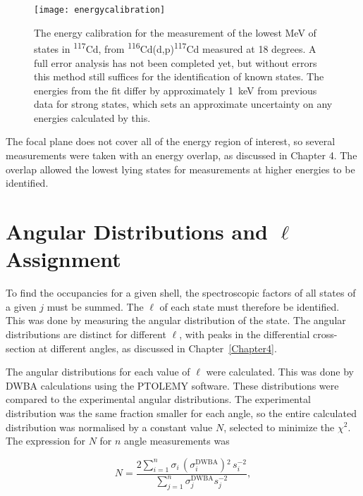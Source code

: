 \begin{figure}[h]	
\hspace*{-0.5cm}
\begin{center}	
	\texttt{[image: energycalibration]}
\end{center}
			\caption[Energy calibration of the position spectrum]{The energy calibration for the measurement of the lowest MeV of states in \textsuperscript{117}Cd, from \textsuperscript{116}Cd(d,p)\textsuperscript{117}Cd measured at 18 degrees. A full error analysis has not been completed yet, but without errors this method still suffices for the identification of known states. The energies from the fit differ by approximately \SI{1}{\kilo\electronvolt} from previous data for strong states, which sets an approximate uncertainty on any energies calculated by this.}
		\label{energyCalibration}
\end{figure}
\FloatBarrier

The focal plane does not cover all of the energy region of interest, so several measurements were taken with an energy overlap, as discussed in Chapter 4. The overlap allowed the lowest lying states for measurements at higher energies to be identified.

\section{Angular Distributions and $\ell$  Assignment}

To find the occupancies for a given shell, the spectroscopic factors of all states of a given $j$ must be summed. The $\ell$  of each state must therefore be identified. This was done by measuring the angular distribution of the state. The angular distributions are distinct for different $\ell$, with peaks in the differential cross-section at different angles, as discussed in Chapter~\ref{Chapter4}.

The angular distributions for each value of $\ell$ were calculated. This was done by DWBA calculations using the PTOLEMY software\cite{ptolemy}. These distributions were compared to the experimental angular distributions. The experimental distribution was the same fraction smaller for each angle, so the entire calculated distribution was normalised by a constant value $N$, selected to minimize the $\chi^2$. The expression for $N$ for $n$ angle measurements was 

\begin{equation}
N = \frac{ 2 \sum_{i = 1}^{n} \sigma_i \, (\sigma_{i}^{\mathrm{DWBA}}) {}^2 \, s_i^{-2} } {\sum_{j = 1}^{n} \sigma_{j}^{\mathrm{DWBA}} s_j^{-2}}\mathrm{,}
\end{equation}


